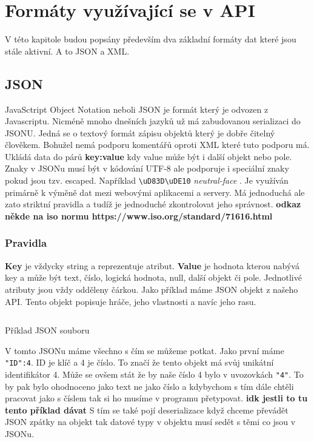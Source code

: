 \chapter{Formáty využívající se v API}
V této kapitole budou popsány především dva základní formáty dat které jsou stále aktivní. A to JSON a XML.

\section{JSON}
JavaSctript Object Notation neboli JSON je formát který je odvozen z Javascriptu. Nicméně mnoho dnešních jazyků už má zabudovanou serializaci do JSONU. Jedná se o textový formát zápisu objektů který je dobře čitelný člověkem. Bohužel nemá podporu komentářů oproti XML které tuto podporu má. Ukládá data do párů \textbf{key:value} kdy value může být i další objekt nebo pole. Znaky v JSONu musí být v kódování UTF-8 ale podporuje i speciální znaky pokud jsou tzv. escaped. Například \verb |\uD83D\uDE10| \textit{neutral-face} . Je využíván primárně k výměně dat mezi webovými aplikacemi a  servery. Má jednoduchá ale zato striktní pravidla a tudíž je jednoduché zkontrolovat jeho správnost. \textbf{odkaz někde na iso normu https://www.iso.org/standard/71616.html} %


\subsection{Pravidla}
\textbf{Key} je vždycky string a reprezentuje atribut. \textbf{Value} je hodnota kterou nabývá key a může být text, číslo, logická hodnota, null, další objekt či pole. Jednotlivé atributy jsou vždy odděleny čárkou. Jako příklad máme JSON objekt z našeho API. Tento objekt popisuje hráče, jeho vlastnosti a navíc jeho rasu.

\newpage

\begin{listing}
  \inputminted{json}{resources/code/player.json}
  \caption{Příklad JSON souboru}
  \label{code:json_player}
\end{listing}

V tomto JSONu máme všechno s čím se můžeme potkat. Jako první máme \verb|"ID":4|. ID je klíč a 4 je číslo. To značí že tento objekt má svůj unikátní identifikátor 4. Může se ovšem stát že by naše číslo 4 bylo v uvozovkách \verb|"4"|. To by pak bylo ohodnoceno jako text ne jako číslo a kdybychom s tím dále chtěli pracovat jako s číslem tak si ho musíme v programu přetypovat. \textbf{idk jestli to tu tento příklad dávat } S tím se také pojí deserializace když chceme převádět JSON zpátky na objekt tak datové typy v objektu musí sedět s těmi co jsou v JSONu.


